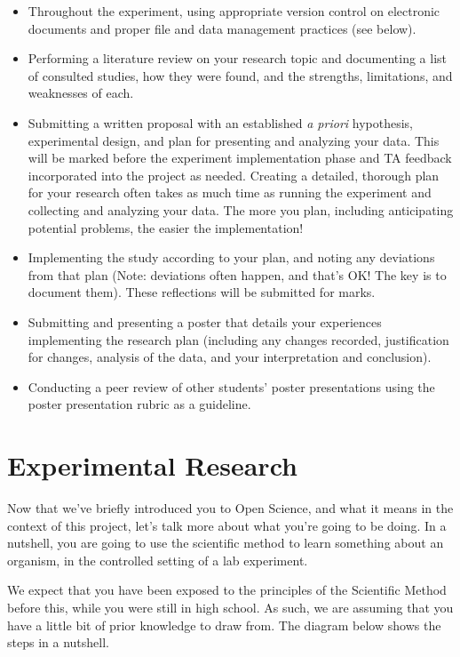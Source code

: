 \documentclass[
]{book}
\providecommand{\tightlist}{%
  \setlength{\itemsep}{0pt}\setlength{\parskip}{0pt}}
\begin{document}
\begin{itemize}
\tightlist
\item
  Throughout the experiment, using appropriate version control on electronic documents and proper file and data management practices (see below).
\item
  Performing a literature review on your research topic and documenting a list of consulted studies, how they were found, and the strengths, limitations, and weaknesses of each.
\item
  Submitting a written proposal with an established \emph{a priori} hypothesis, experimental design, and plan for presenting and analyzing your data. This will be marked before the experiment implementation phase and TA feedback incorporated into the project as needed. Creating a detailed, thorough plan for your research often takes as much time as running the experiment and collecting and analyzing your data. The more you plan, including anticipating potential problems, the easier the implementation!
\item
  Implementing the study according to your plan, and noting any deviations from that plan (Note: deviations often happen, and that's OK! The key is to document them). These reflections will be submitted for marks.
\item
  Submitting and presenting a poster that details your experiences implementing the research plan (including any changes recorded, justification for changes, analysis of the data, and your interpretation and conclusion).
\item
  Conducting a peer review of other students' poster presentations using the poster presentation rubric as a guideline.
\end{itemize}

\hypertarget{experimental-research}{%
\section*{Experimental Research}\label{experimental-research}}

Now that we've briefly introduced you to Open Science, and what it means in the context of this project, let's talk more about what you're going to be doing. In a nutshell, you are going to use the scientific method to learn something about an organism, in the controlled setting of a lab experiment.

We expect that you have been exposed to the principles of the Scientific Method before this, while you were still in high school. As such, we are assuming that you have a little bit of prior knowledge to draw from. The diagram below shows the steps in a nutshell.
\end{document}
